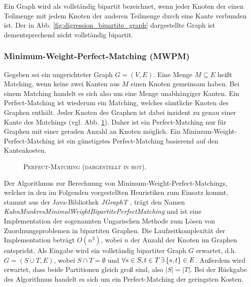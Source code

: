 Ein Graph wird als vollständig bipartit bezeichnet, wenn jeder Knoten der einen Teilmenge mit jedem Knoten
der anderen Teilmenge durch eine Kante verbunden ist. Der in Abb. \ref{fig:digression_bipartite_graph}
dargestellte Graph ist dementsprechend nicht vollständig bipartit.

\subsubsection{Minimum-Weight-Perfect-Matching (\textsc{MWPM})}
\label{sec:digression_mwpm}

Gegeben sei ein ungerichteter Graph $G = (V, E)$. Eine Menge $M \subseteq E$ heißt Matching,
wenn keine zwei Kanten aus $M$ einen Knoten gemeinsam haben. Bei einem Matching handelt es sich also
um eine Menge unabhängiger Kanten. Ein Perfect-Matching ist wiederum ein Matching, welches sämtliche Knoten des Graphen enthält.
Jeder Knoten des Graphen ist dabei inzident zu genau einer Kante des Matchings (vgl. Abb. \ref{fig:perfect_matching}).
Daher ist ein Perfect-Matching nur für Graphen mit einer geraden Anzahl an Knoten möglich.
Ein Minimum-Weight-Perfect-Matching ist ein günstigstes Perfect-Matching basierend auf den Kantenkosten.
\begin{figure}[H]
\centering
{}
\caption{\textsc{Perfect-Matching (dargestellt in rot).}}
\label{fig:perfect_matching}
\end{figure}

Der Algorithmus zur Berechnung von Minimum-Weight-Perfect-Matchings, welcher in den im Folgenden
vorgestellten Heuristiken zum Einsatz kommt, stammt aus der Java-Bibliothek \textit{JGraphT} \cite{JGraphT}, trägt
den Namen \textit{KuhnMunkresMinimalWeightBipartitePerfectMatching} und ist eine Implementation der
sogenannten Ungarischen Methode zum Lösen von Zuordnungsproblemen in bipartiten Graphen.
Die Laufzeitkomplexität der Implementation beträgt $O(n^3)$, wobei $n$ der Anzahl der Knoten im Graphen entspricht.
Als Eingabe wird ein vollständig bipartiter Graph $G$ erwartet, d.h. $G= (S \cup T, E)$, wobei $S \cap T = \emptyset$ und
$\forall s \in S, t \in T \thinspace \exists \thinspace \{s, t\} \in E$. Außerdem wird erwartet, dass beide Partitionen gleich groß sind,
also $|S| = |T|$. Bei der Rückgabe des Algorithmus handelt es sich um ein Perfect-Matching der geringsten Kosten.

